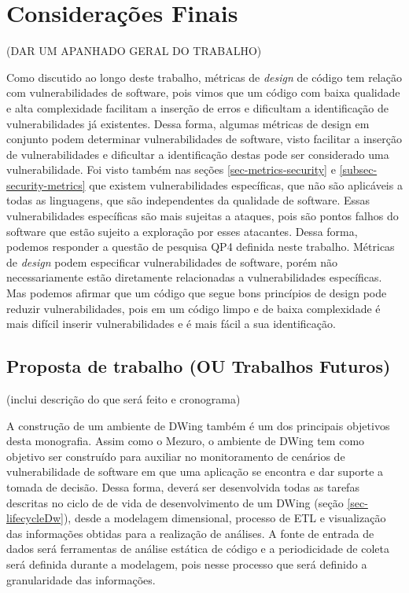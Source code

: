 \chapter{Considerações Finais}
\label{cap-consideracoesFinais}


(DAR UM APANHADO GERAL DO TRABALHO)



Como discutido ao longo deste trabalho, métricas de \emph{design} de código tem relação com  vulnerabilidades de software, pois vimos que um código com baixa qualidade e alta complexidade facilitam a inserção de erros e dificultam a identificação de vulnerabilidades já existentes. Dessa forma, algumas métricas de design em conjunto podem determinar vulnerabilidades de software, visto facilitar a inserção de vulnerabilidades e dificultar a identificação destas pode ser considerado uma vulnerabilidade. Foi visto também nas seções \ref{sec-metrics-security} e \ref{subsec-security-metrics} que existem vulnerabilidades específicas, que não são aplicáveis a todas as linguagens, que são independentes da qualidade de software. Essas vulnerabilidades específicas são mais sujeitas a ataques, pois são pontos falhos do software que estão sujeito a exploração por esses atacantes. Dessa forma, podemos responder a questão de pesquisa QP4 definida neste trabalho. Métricas de \emph{design} podem especificar vulnerabilidades de software, porém não necessariamente estão diretamente relacionadas a vulnerabilidades específicas. Mas podemos afirmar que um código que segue bons princípios de design pode reduzir vulnerabilidades, pois em um código limpo e de baixa complexidade é mais difícil inserir vulnerabilidades e é mais fácil a sua identificação.






\section{Proposta de trabalho (OU Trabalhos Futuros)}

(inclui descrição do que será feito e cronograma)


%

A construção de um ambiente de DWing também é um dos principais objetivos desta monografia. Assim como o Mezuro, o ambiente de DWing tem como objetivo ser construído para auxiliar no monitoramento de cenários de vulnerabilidade de software em que uma aplicação se encontra e dar suporte a tomada de decisão. Dessa forma, deverá ser desenvolvida todas as tarefas descritas no ciclo de de vida de desenvolvimento de um DWing (seção \ref{sec-lifecycleDw}), desde a modelagem dimensional, processo de ETL e visualização das informações obtidas para a realização de análises. A fonte de entrada de dados será ferramentas de análise estática de código e a periodicidade de coleta será definida durante a modelagem, pois nesse processo que será definido a granularidade das informações.

